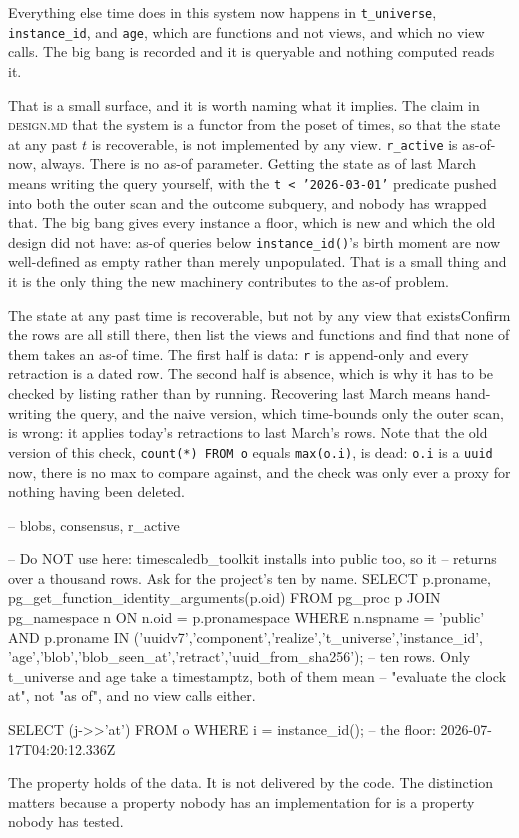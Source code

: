Everything else time does in this system now happens in \texttt{t\_universe}, \texttt{instance\_id}, and \texttt{age}, which are functions and not views, and which no view calls. The big bang is recorded and it is queryable and nothing computed reads it.

That is a small surface, and it is worth naming what it implies. The claim in \textsc{design.md} that the system is a functor from the poset of times, so that the state at any past $t$ is recoverable, is not implemented by any view. \texttt{r\_active} is as-of-now, always. There is no as-of parameter. Getting the state as of last March means writing the query yourself, with the \texttt{t < '2026-03-01'} predicate pushed into both the outer scan and the outcome subquery, and nobody has wrapped that. The big bang gives every instance a floor, which is new and which the old design did not have: as-of queries below \texttt{instance\_id()}'s birth moment are now well-defined as empty rather than merely unpopulated. That is a small thing and it is the only thing the new machinery contributes to the as-of problem.

\begin{Correspondence}{The state at any past time is recoverable, but not by any view that exists}{Confirm the rows are all still there, then list the views and functions and find that none of them takes an as-of time.}
The first half is data: \texttt{r} is append-only and every retraction is a dated row. The second half is absence, which is why it has to be checked by listing rather than by running. Recovering last March means hand-writing the query, and the naive version, which time-bounds only the outer scan, is wrong: it applies today's retractions to last March's rows. Note that the old version of this check, \texttt{count(*) FROM o} equals \texttt{max(o.i)}, is dead: \texttt{o.i} is a \texttt{uuid} now, there is no max to compare against, and the check was only ever a proxy for nothing having been deleted.
\begin{Check}
\dv   -- blobs, consensus, r_active

-- Do NOT use \df here: timescaledb_toolkit installs into public too, so it
-- returns over a thousand rows. Ask for the project's ten by name.
SELECT p.proname, pg_get_function_identity_arguments(p.oid)
  FROM pg_proc p JOIN pg_namespace n ON n.oid = p.pronamespace
 WHERE n.nspname = 'public'
   AND p.proname IN ('uuidv7','component','realize','t_universe','instance_id',
                     'age','blob','blob_seen_at','retract','uuid_from_sha256');
-- ten rows. Only t_universe and age take a timestamptz, both of them mean
-- "evaluate the clock at", not "as of", and no view calls either.

SELECT (j->>'at') FROM o WHERE i = instance_id();  -- the floor: 2026-07-17T04:20:12.336Z
\end{Check}
The property holds of the data. It is not delivered by the code. The distinction matters because a property nobody has an implementation for is a property nobody has tested.
\end{Correspondence}

